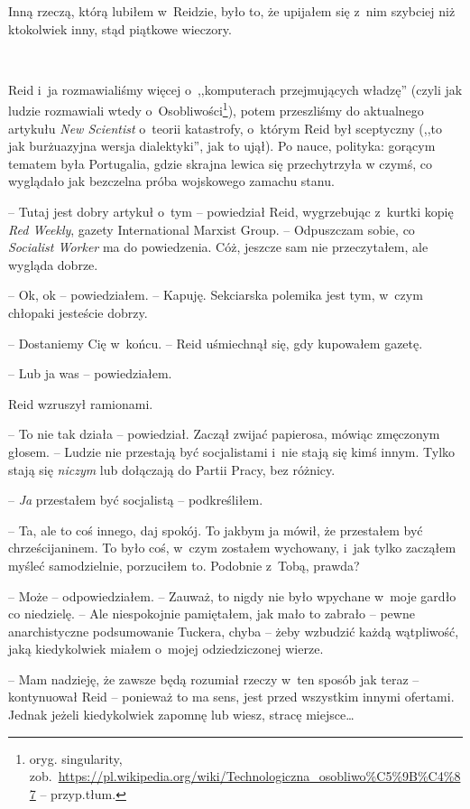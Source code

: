 \documentclass[oneside,polish,11pt,sfheadings]{mwbk}
\begin{document}
Inną rzeczą, którą lubiłem w~Reidzie, było to, że upijałem się z~nim
szybciej niż ktokolwiek inny, stąd piątkowe wieczory.

~

Reid i~ja rozmawialiśmy więcej o~,,komputerach przejmujących władzę''
(czyli jak ludzie rozmawiali wtedy o~Osobliwości\footnote{oryg. singularity,
zob.~\url{https://pl.wikipedia.org/wiki/Technologiczna_osobliwo\%C5\%9B\%C4\%87}
 -- przyp.tłum.}), potem przeszliśmy do aktualnego artykułu \emph{New
Scientist} o~teorii katastrofy, o~którym Reid był sceptyczny (,,to jak
burżuazyjna wersja dialektyki'', jak to ujął). Po nauce, polityka:
gorącym tematem była Portugalia, gdzie skrajna lewica się przechytrzyła
w czymś, co wyglądało jak bezczelna próba wojskowego zamachu stanu.

-- Tutaj jest dobry artykuł o~tym -- powiedział Reid, wygrzebując z~kurtki
kopię \emph{Red Weekly}, gazety International Marxist Group. -- Odpuszczam sobie, co \emph{Socialist Worker }ma do powiedzenia. Cóż,
jeszcze sam nie przeczytałem, ale wygląda dobrze.

-- Ok, ok -- powiedziałem. -- Kapuję. Sekciarska polemika jest tym, w~czym
chłopaki jesteście dobrzy.

-- Dostaniemy Cię w~końcu. -- Reid uśmiechnął się, gdy kupowałem gazetę.

-- Lub ja was -- powiedziałem.

Reid wzruszył ramionami. 

-- To nie tak działa -- powiedział. Zaczął
zwijać papierosa, mówiąc zmęczonym głosem. -- Ludzie nie przestają być
socjalistami i~nie stają się kimś innym. Tylko stają się \emph{niczym}
lub dołączają do Partii Pracy, bez różnicy.

-- \emph{Ja} przestałem być socjalistą -- podkreśliłem.

-- Ta, ale to coś innego, daj spokój. To jakbym ja mówił, że przestałem
być chrześcijaninem. To było coś, w~czym zostałem wychowany, i~jak tylko
zacząłem myśleć samodzielnie, porzuciłem to. Podobnie z~Tobą, prawda?

-- Może -- odpowiedziałem. -- Zauważ, to nigdy nie było wpychane w~moje
gardło co niedzielę. -- Ale niespokojnie pamiętałem, jak mało to zabrało
-- pewne anarchistyczne podsumowanie Tuckera, chyba -- żeby wzbudzić każdą
wątpliwość, jaką kiedykolwiek miałem o~mojej odziedziczonej wierze.

-- Mam nadzieję, że zawsze będą rozumiał rzeczy w~ten sposób jak teraz -- kontynuował Reid -- ponieważ to ma sens, jest przed wszystkim innymi
ofertami. Jednak jeżeli kiedykolwiek zapomnę lub wiesz, stracę
miejsce\ldots
\end{document}
